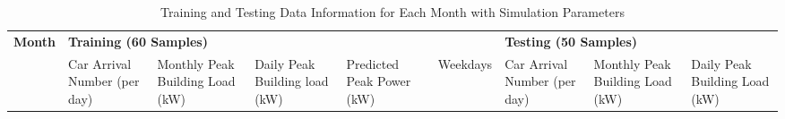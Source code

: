 \begin{table*}[htp]
    \centering
    \small 
    \caption{Training and Testing Data Information for Each Month with Simulation Parameters}
    \begin{tabular}{|p{1.0cm}|p{1.5cm}|p{1.7cm}|p{1.7cm}|p{1.0cm}|p{1.0cm}|p{1.5cm}|p{1.7cm}|p{1.7cm}|}
    \hline
    \multirow{2}{*}{\textbf{Month}} & \multicolumn{5}{p{3.75cm}|}{\textbf{Training (60 Samples)}} & \multicolumn{3}{p{3.75cm}|}{\textbf{Testing (50 Samples)}} \\ 
    \cline{2-9} 
    & {Car Arrival Number (per day)} & {Monthly Peak Building Load (kW)} & {Daily Peak Building load (kW)} & {Predicted Peak Power (kW)} & {Weekdays} & {Car Arrival Number (per day)} & {Monthly Peak Building Load (kW)} & {Daily Peak Building Load (kW)} \\ \hline 
    

\end{tabular}
\end{table*}
